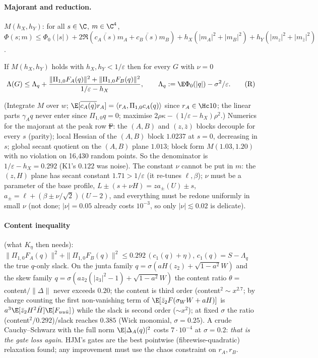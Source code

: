 \paragraph{Majorant and reduction.} $M(h_X,h_Y)$: for all $s\in\C$, $m\in\C^4$,
$\Phi(s;m)\le\Phi_0(|s|)+2\Re(\overline{c_A(s)}m_A+\overline{c_B(s)}m_B)+h_X(|m_A|^2+|m_B|^2)+h_Y(|m_z|^2+|m_{\bar z}|^2)$.
\begin{proposition}\label{prop:R}
If $M(h_X,h_Y)$ holds with $h_X,h_Y<1/\varepsilon$ then for every $G$ with $\nu=0$
\[
\Lambda(G)\le\Lambda_q+\frac{\|\Pi_{1,0}F_A(q)\|^2+\|\Pi_{1,0}F_B(q)\|^2}{1/\varepsilon-h_X},\qquad\Lambda_q:=\E\Phi_0(|q|)-\sigma^2/\varepsilon.\tag{R}
\]
\end{proposition}
(Integrate $M$ over $w$; $\E[\overline{c_A(q)}r_A]=\langle r_A,\Pi_{1,0}c_A(q)\rangle$ since $r_A\in\Hc10$; the linear parts $\gamma_Aq$ never enter since
$\Pi_{1,0}q=0$; maximise $2\rho\kappa-(1/\varepsilon-h_X)\rho^2$.) Numerics for the majorant at the peak row \st{F}: the $(A,B)$ and $(z,\bar z)$ blocks decouple for every $s$
(parity); local Hessian of the $(A,B)$ block $1.0237$ at $s=0$, decreasing in $s$; global secant quotient on the $(A,B)$ plane $1.013$; block form $M(1.03,1.20)$
with no violation on 16,430 random points. So the denominator is $1/\varepsilon-h_X=0.292$ (K1's $0.122$ was noise). The constant $\nu$ cannot be put in $m$: the
$(z,H)$ plane has secant constant $1.71>1/\varepsilon$ (it re-tunes $\ell,\beta$); $\nu$ must be a parameter of the base profile, $L\pm(s+\nu H)=za_\pm(U)\pm s$,
$a_\pm=\ell+(\beta\pm\nu/\sqrt2)(U-2)$, and everything must be redone uniformly in small $\nu$ (not done; $|\nu|=0.05$ already costs $10^{-3}$, so only $|\nu|\lesssim0.02$ is delicate).
\paragraph{Content inequality} (what $K_\eta$ then needs): $\|\Pi_{1,0}F_A(q)\|^2+\|\Pi_{1,0}F_B(q)\|^2\le0.292\,(c_1(q)+\eta)$, $c_1(q)=S-\Lambda_q$ the true $q$-only slack. On
the junta family $q=\sigma(aH(z_2)+\sqrt{1-a^2}W)$ and the skew family $q=\sigma(az_2(|z_3|^2-1)+\sqrt{1-a^2}W)$ the content ratio $\theta=$content$/\|\Delta\|$ never
exceeds $0.20$; the content is third order (content$^2\sim x^{2.7}$; by charge counting the first non-vanishing term of $\E[\bar z_2F(\sigma_WW+aH)]$ is
$a^3\E[\bar z_2H^2\bar H]\E[F_{uu\bar u}]$) while the slack is second order ($\sim x^2$); at fixed $\sigma$ the ratio (content$^2/0.292$)/slack reaches $0.385$
(Wick monomial, $\sigma=0.25$). A crude Cauchy--Schwarz with the full norm $\E|\Delta_A(q)|^2$ costs $7\cdot10^{-4}$ at $\sigma=0.2$: \emph{that is the gate loss again}.
HJM's gates are the best pointwise (fibrewise-quadratic) relaxation found; any improvement must use the chaos constraint on $r_A,r_B$.

